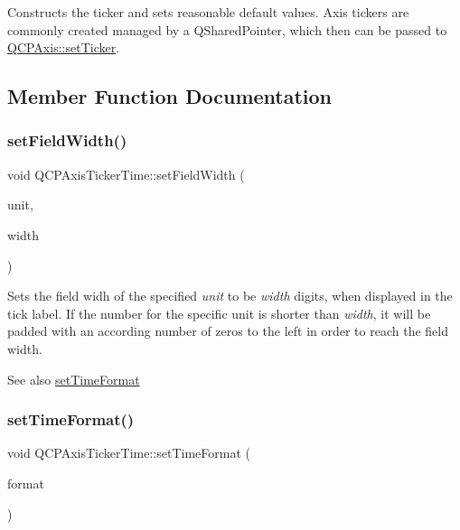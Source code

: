 Constructs the ticker and sets reasonable default values. Axis tickers are commonly created managed by a Q\+Shared\+Pointer, which then can be passed to \hyperlink{class_q_c_p_axis_a4ee03fcd2c74d05cd1a419b9af5cfbdc}{Q\+C\+P\+Axis\+::set\+Ticker}. 

\subsection{Member Function Documentation}
\mbox{\label{class_q_c_p_axis_ticker_time_adc13e54fc969be98a5c0e3fa0dbaa293}} 
\subsubsection{\texorpdfstring{set\+Field\+Width()}{setFieldWidth()}}
{\footnotesize\ttfamily void Q\+C\+P\+Axis\+Ticker\+Time\+::set\+Field\+Width (\begin{DoxyParamCaption}\item[{\hyperlink{class_q_c_p_axis_ticker_time_a5c48ded8c6d3a1aca9b68219469fea3e}{Q\+C\+P\+Axis\+Ticker\+Time\+::\+Time\+Unit}}]{unit,  }\item[{int}]{width }\end{DoxyParamCaption})}

Sets the field widh of the specified {\itshape unit} to be {\itshape width} digits, when displayed in the tick label. If the number for the specific unit is shorter than {\itshape width}, it will be padded with an according number of zeros to the left in order to reach the field width.

\begin{DoxySeeAlso}{See also}
\hyperlink{class_q_c_p_axis_ticker_time_a2f30b6e5125bce4256be9ce3177088ea}{set\+Time\+Format} 
\end{DoxySeeAlso}
\mbox{\label{class_q_c_p_axis_ticker_time_a2f30b6e5125bce4256be9ce3177088ea}} 
\subsubsection{\texorpdfstring{set\+Time\+Format()}{setTimeFormat()}}
{\footnotesize\ttfamily void Q\+C\+P\+Axis\+Ticker\+Time\+::set\+Time\+Format (\begin{DoxyParamCaption}\item[{const Q\+String \&}]{format }\end{DoxyParamCaption})}

